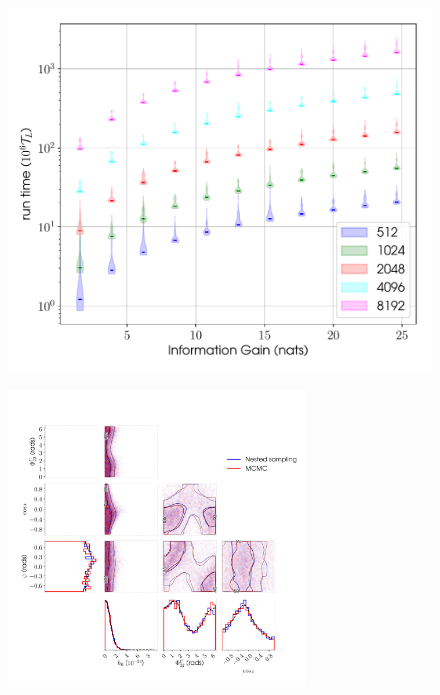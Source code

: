 \begin{figure}[!phtb]
\begin{center}
\includegraphics[width=1\columnwidth]{./figures/proptesting/walk_uniform_prop/timing/walk_uniform_prop_timings}
\caption{ \protect}
\end{center}
\end{figure}



\begin{figure}[phtb]
\begin{center}
\includegraphics[width=0.7\textwidth]{./figures/codeeval/simulations/noise/simulatednoisetest}
\caption{ \protect}
\end{center}
\end{figure}


